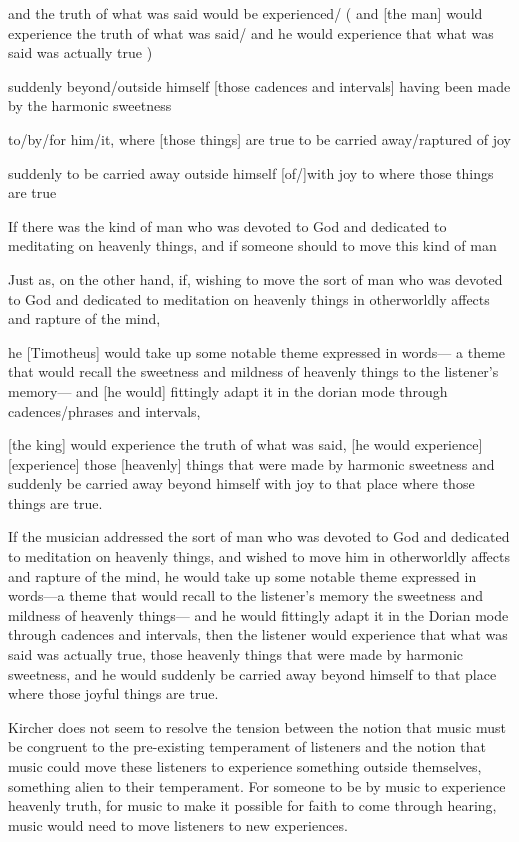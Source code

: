 and the truth of what was said would be experienced/
( and [the man] would experience the truth of what was said/
 and he would experience that what was said was actually true )

suddenly beyond/outside himself
[those cadences and intervals] having been made by the harmonic sweetness

to/by/for him/it,
where 
[those things] are true
to be carried away/raptured
of joy

suddenly to be carried away outside himself
[of/]with joy to where those things are true

If there was the kind of man who was devoted to God
and dedicated to meditating on heavenly things,
and if someone should to move this kind of man 

Just as, on the other hand, 
if, 
wishing to move the sort of man 
    who was devoted to God and dedicated to meditation on heavenly things
  in otherworldly affects and rapture of the mind,

he [Timotheus] would take up 
some notable theme expressed in words---
  a theme that would recall the sweetness and mildness of heavenly things
  to the listener's memory---
and [he would] fittingly adapt it 
  in the dorian mode through cadences/phrases and intervals,

[the king] would experience the truth of what was said,
[he would experience]
[experience] those [heavenly] things that were made by harmonic sweetness
and suddenly be carried away beyond himself with joy 
to that place where those things are true. 

If the musician addressed the sort of man who was devoted to God and dedicated to meditation on heavenly things,
and wished to move him in otherworldly affects and rapture of the mind,
he would take up some notable theme expressed in words---a theme that would recall to the listener's memory the sweetness and mildness of heavenly things---
and he would fittingly adapt it in the Dorian mode through cadences and intervals,
then the listener would experience that what was said was actually true,
those heavenly things that were made by harmonic sweetness,
and he would suddenly be carried away beyond himself to that place where those joyful things are true.



Kircher does not seem to resolve the tension between the notion that music must be congruent to the pre-existing temperament of listeners and the notion that music could move these listeners to experience something outside themselves, something alien to their temperament.
For someone to be  by music to experience heavenly truth, for music to make it possible for faith to come through hearing, music would need to move listeners to new experiences.














 
